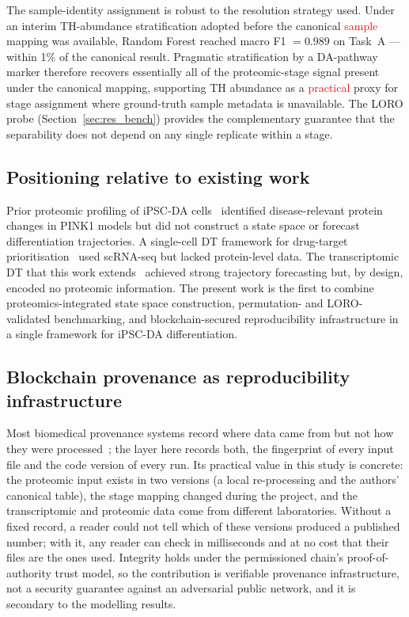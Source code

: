 \documentclass[5p,times,twocolumn]{elsarticle}
\newcommand{\rtag}[1]{}
\newenvironment{revblock}[1]{\par\color{red}\rtag{#1}\ignorespaces}{\par}
\newcommand{\lang}[1]{\textcolor{red}{#1}}
\begin{document}
The sample-identity assignment is robust to the resolution
strategy used.
Under an interim TH-abundance stratification adopted before the
canonical \lang{sample} mapping was available, Random Forest reached
macro F1 $= 0.989$ on Task~A --- within 1\% of the canonical
result.
Pragmatic stratification by a DA-pathway marker therefore
recovers essentially all of the proteomic-stage signal present
under the canonical mapping, supporting TH abundance as a
\lang{practical} proxy for stage assignment where ground-truth sample
metadata is unavailable.
The LORO probe (Section~\ref{sec:res_bench}) provides the
complementary guarantee that the separability does not depend on
any single replicate within a stage.

\subsection{\textbf{Positioning relative to existing work}}

Prior proteomic profiling of iPSC-DA
cells~\cite{novak2022single} identified disease-relevant protein
changes in PINK1 models but did not construct a state space or
forecast differentiation trajectories.
A single-cell DT framework for drug-target
prioritisation~\cite{li2022dynamic} used scRNA-seq but lacked
protein-level data.
The transcriptomic DT that this work
extends~\cite{kanu2026transformer} achieved strong trajectory
forecasting but, by design, encoded no proteomic information.
The present work is the first to combine proteomics-integrated
state space construction, permutation- and LORO-validated
benchmarking, and blockchain-secured reproducibility
infrastructure in a single framework for iPSC-DA
differentiation.

\subsection{\textbf{Blockchain provenance as reproducibility
    infrastructure}}

\begin{revblock}{R1.14,R2.16}
  Most biomedical provenance systems record where data came from
  but not how they were processed~\cite{johns2023data}; the layer
  here records both, the fingerprint of every input file and the
  code version of every run. Its practical value in this study
  is concrete: the proteomic input exists in two versions (a local
  re-processing and the authors' canonical table), the stage
  mapping changed during the project, and the transcriptomic and
  proteomic data come from different laboratories. Without a
  fixed record, a reader could not tell which of these versions
  produced a published number; with it, any reader can check in
  milliseconds and at no cost that their files are the ones used.
  Integrity holds under the permissioned chain's
  proof-of-authority trust model, so the contribution is
  verifiable provenance infrastructure, not a security guarantee
  against an adversarial public network, and it is secondary to
  the modelling results.
\end{revblock}
\end{document}
